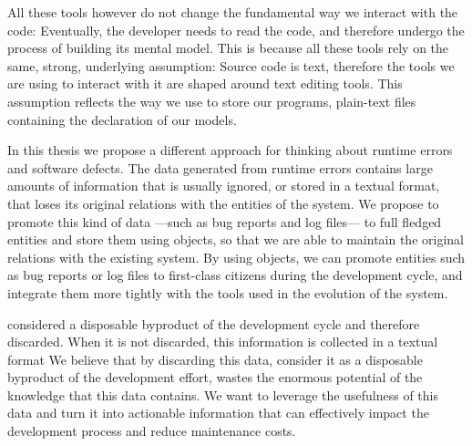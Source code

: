 All these tools however do not change the fundamental way we interact with the code: Eventually, the developer needs to read the code, and therefore undergo the process of building its mental model.
This is because all these tools rely on the same, strong, underlying assumption: Source code is text, therefore the tools we are using to interact with it are shaped around text editing tools.
This assumption reflects the way we use to store our programs, \ie plain-text files containing the declaration of our models.


In this thesis we propose a different approach for thinking about runtime errors and software defects.
The data generated from runtime errors contains large amounts of information that is usually ignored, or stored in a textual format, that loses its original relations with the entities of the system.
We propose to promote this kind of data ---such as bug reports and log files--- to full fledged entities and store them using objects, so that we are able to maintain the original relations with the existing system.
By using objects, we can promote entities such as bug reports or log files to first-class citizens during the development cycle, and integrate them more tightly with the tools used in the evolution of the system.

considered a disposable byproduct of the development cycle and therefore discarded.
When it is not discarded, this information is collected in a textual format
We believe that by discarding this data, consider it as a disposable byproduct of the development effort, wastes the enormous potential of the knowledge that this data contains.
We want to leverage the usefulness of this data and turn it into actionable information that can effectively impact the development process and reduce maintenance costs.

